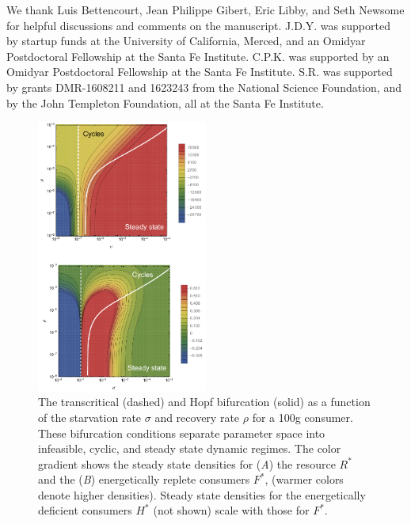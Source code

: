 \documentclass{pnastwo}
\begin{document}
\begin{article}
\begin{acknowledgments}
  We thank Luis Bettencourt, Jean Philippe Gibert, Eric Libby, and Seth Newsome for helpful
  discussions and comments on the manuscript.  J.D.Y. was supported by
  startup funds at the University of California, Merced, and an Omidyar
  Postdoctoral Fellowship at the Santa Fe Institute.  C.P.K. was supported by
  an Omidyar Postdoctoral Fellowship at the Santa Fe Institute.  S.R. was
  supported by grants DMR-1608211 and 1623243 from the National Science
  Foundation, and by the John Templeton Foundation, all at the Santa Fe
  Institute.
\end{acknowledgments}






\end{article}



\begin{figure}
\centering
\includegraphics[width=0.5\textwidth]{fig_FixedPoint.pdf}
\caption{ The transcritical (dashed) and Hopf bifurcation (solid) as a
  function of the starvation rate $\sigma$ and recovery rate $\rho$ for a 100g consumer.  These
  bifurcation conditions separate parameter space into infeasible, cyclic,
  and steady state dynamic regimes.  The color gradient shows the steady
  state densities for (\emph{A}) the resource $R^*$ and the (\emph{B}) energetically
  replete consumers $F^*$, (warmer colors denote higher densities).  Steady
  state densities for the energetically deficient consumers $H^*$ (not shown)
  scale with those for $F^*$.  }
\label{fig:fp}
\end{figure}
\end{document}
